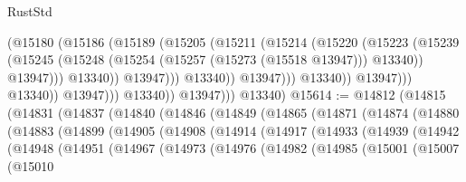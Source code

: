 \begin{lexlean}{RustStd}
\begin{coremodule}
                                          (@15180
                                            (@15186
                                              (@15189
                                                (@15205
                                                  (@15211
                                                    (@15214
                                                      (@15220
                                                        (@15223
                                                          (@15239
                                                            (@15245
                                                              (@15248
                                                                (@15254
                                                                  (@15257 (@15273 (@15518 @13947)))
                                                                  @13340))
                                                              @13947)))
                                                        @13340))
                                                    @13947)))
                                              @13340))
                                          @13947)))
                                    @13340))
                                @13947)))
                          @13340))
                      @13947)))
                @13340))
            @13947)))
      @13340)
@15614 := @14812
    (@14815
      (@14831
        (@14837
          (@14840
            (@14846
              (@14849
                (@14865
                  (@14871
                    (@14874
                      (@14880
                        (@14883
                          (@14899
                            (@14905
                              (@14908
                                (@14914
                                  (@14917
                                    (@14933
                                      (@14939
                                        (@14942
                                          (@14948
                                            (@14951
                                              (@14967
                                                (@14973
                                                  (@14976
                                                    (@14982
                                                      (@14985
                                                        (@15001
                                                          (@15007
                                                            (@15010

\end{coremodule}
\end{lexlean}
